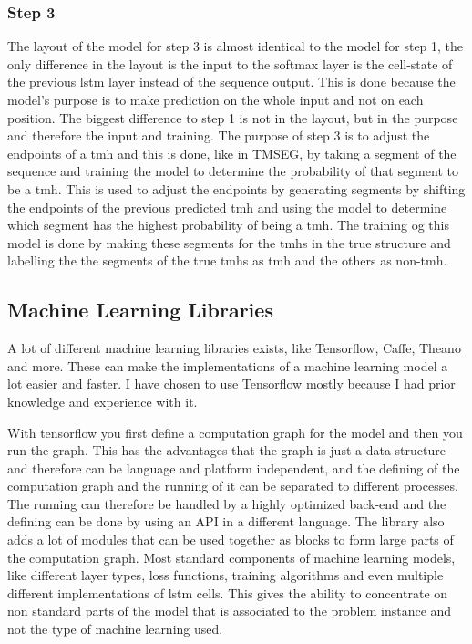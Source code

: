 \subsubsection{Step 3}
The layout of the model for step 3 is almost identical to the model for step 1, the only difference
in the layout is the input to the softmax layer is the cell-state of the previous \gls{lstm} layer
instead of the sequence output. This is done because the model's purpose is to make prediction on
the whole input and not on each position. The biggest difference to step 1 is not in the layout,
but in the purpose and therefore the input and training. The purpose of step 3 is to adjust the 
endpoints of a \gls{tmh} and this is done, like in TMSEG, by taking a segment of the sequence 
and training the model to determine the probability of that segment to be a \gls{tmh}. 
This is used to adjust the endpoints by generating segments by shifting the endpoints of the 
previous predicted \gls{tmh} and using the model to determine which segment has the highest
probability of being a \gls{tmh}. The training og this model is done by making these segments for
the \glspl{tmh} in the true structure and labelling the the segments of the true \glspl{tmh} as \gls{tmh}
and the others as non-\gls{tmh}. 

\subsection{Machine Learning Libraries}
A lot of different machine learning libraries exists, like Tensorflow\cite{tensorflow}, Caffe\cite{caffe}, 
Theano\cite{theano} and more. These can make the implementations of a machine learning model a lot easier 
and faster. I have chosen to use Tensorflow mostly because I had prior knowledge and experience with it.

With tensorflow you first define a computation graph for the model and then you run the graph.
This has the advantages that the graph is just a data structure and therefore can be language and platform 
independent, and the defining of the computation graph and the running of it can be separated to different 
processes. The running can therefore be handled by a highly optimized back-end and the defining can be done 
by using an API in a different language.
The library also adds a lot of modules that can be used together as blocks to form large parts of the 
computation graph. Most standard components of machine learning models, like different layer types, 
loss functions, training algorithms and even multiple different implementations of \gls{lstm} cells.
This gives the ability to concentrate on non standard parts of the model that is associated to the 
problem instance and not the type of machine learning used.

